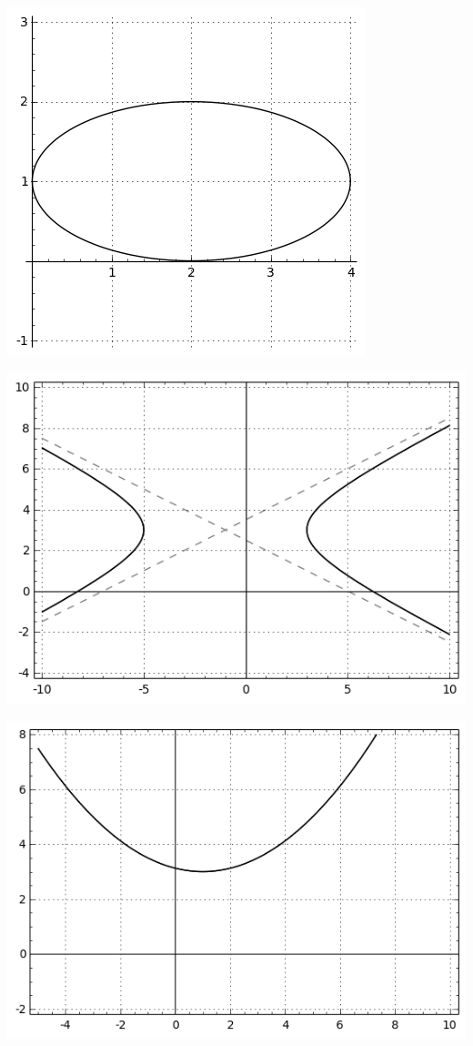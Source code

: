 \begin{center}\includegraphics[scale=.8]{ellipse1.png}

\includegraphics[scale=.75]{hyperbola1.png}

\includegraphics[scale=.75]{parabola1.png} \end{center}
